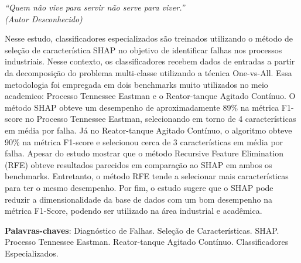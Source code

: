 \documentclass[
	12pt,				%
	openright,			%
	oneside,			%
	a4paper,			%
	english,			%
	french,				%
	spanish,			%
	brazil				%
	]{abntex2}
\begin{document}
\begin{epigrafe}
  \vspace*{\fill}
  \begin{flushright}
    \textit{``Quem não vive para servir não serve para viver.''\\
      (Autor Desconhecido)}
  \end{flushright}
\end{epigrafe}


\setlength{\absparsep}{18pt}
\begin{resumo}

  Nesse estudo, classificadores especializados são treinados utilizando o método de seleção de característica SHAP no objetivo de identificar falhas nos processos industriais. Nesse contexto, os classificadores recebem dados de entradas a partir da decomposição do problema multi-classe utilizando a técnica One-vs-All. Essa metodologia foi empregada em dois benchmarks muito utilizados no meio academico: Processo Tennessee Eastman e o Reator-tanque Agitado Contínuo. O método SHAP obteve um desempenho de aproximadamente 89\% na métrica F1-score no Processo Tennessee Eastman, selecionando em torno de 4 características em média por falha. Já no Reator-tanque Agitado Contínuo, o algoritmo obteve 90\% na métrica F1-score e selecionou cerca de 3 características em média por falha. Apesar do estudo mostrar que o método Recursive Feature Elimination (RFE) obteve resultados parecidos em comparação ao SHAP em ambos os benchmarks. Entretanto, o método RFE tende a selecionar mais características para ter o mesmo desempenho. Por fim, o estudo sugere que o SHAP pode reduzir a dimensionalidade da base de dados com um bom desempenho na métrica F1-Score, podendo ser utilizado na área industrial e acadêmica.

  \textbf{Palavras-chaves}: Diagnóstico de Falhas. Seleção de Características. SHAP. Processo Tennessee Eastman. Reator-tanque Agitado Contínuo. Classificadores Especializados.
\end{resumo}

\listoffigures*
\cleardoublepage

\listoftables*
\cleardoublepage

\end{document}
